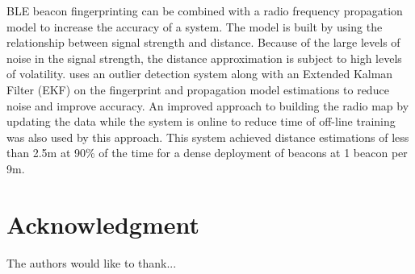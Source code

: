 \documentclass[conference]{IEEEtran}
\begin{document}
BLE beacon fingerprinting can be combined with a radio frequency propagation model to increase the accuracy of a system. The model is built by using the relationship between signal strength and distance. Because of the large levels of noise in the signal strength, the distance approximation is subject to high levels of volatility. \cite{zhuang2016smartphone} uses an outlier detection system along with an Extended Kalman Filter (EKF) on the fingerprint and propagation model estimations to reduce noise and improve accuracy. An improved approach to building the radio map by updating the data while the system is online to reduce time of off-line training was also used by this approach. This system achieved distance estimations of less than 2.5m at 90\% of the time for a dense deployment of beacons at 1 beacon per 9m.

\section*{Acknowledgment}


The authors would like to thank...








\end{document}
